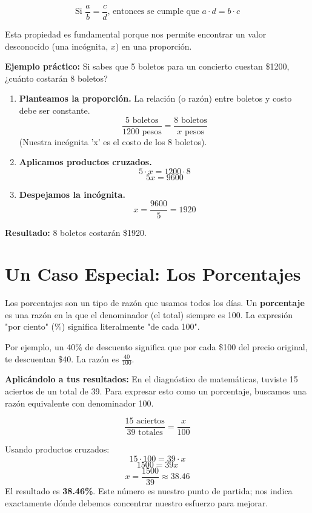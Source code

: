 \documentclass[12pt,a4paper]{article}
\begin{document}
$$ \text{Si } \frac{a}{b} = \frac{c}{d} \text{, entonces se cumple que } a \cdot d = b \cdot c $$

Esta propiedad es fundamental porque nos permite encontrar un valor desconocido (una inc\'{o}gnita, $x$) en una proporci\'{o}n.

\textbf{Ejemplo pr\'{a}ctico:} Si sabes que 5 boletos para un concierto cuestan \$1200, ¿cu\'{a}nto costar\'{a}n 8 boletos?

\begin{enumerate}
    \item \textbf{Planteamos la proporci\'{o}n.} La relaci\'{o}n (o raz\'{o}n) entre boletos y costo debe ser constante.
    $$ \frac{5 \text{ boletos}}{1200 \text{ pesos}} = \frac{8 \text{ boletos}}{x \text{ pesos}} $$
    (Nuestra inc\'{o}gnita 'x' es el costo de los 8 boletos).

    \item \textbf{Aplicamos productos cruzados.}
    $$ 5 \cdot x = 1200 \cdot 8 $$
    $$ 5x = 9600 $$

    \item \textbf{Despejamos la inc\'{o}gnita.}
    $$ x = \frac{9600}{5} = 1920 $$
\end{enumerate}
\textbf{Resultado:} 8 boletos costar\'{a}n \$1920.

\section{Un Caso Especial: Los Porcentajes}

Los porcentajes son un tipo de raz\'{o}n que usamos todos los d\'{i}as. Un \textbf{porcentaje} es una raz\'{o}n en la que el denominador (el total) siempre es 100. La expresi\'{o}n "por ciento" (\%) significa literalmente "de cada 100".

Por ejemplo, un 40\% de descuento significa que por cada \$100 del precio original, te descuentan \$40. La raz\'{o}n es $ \frac{40}{100} $.

\textbf{Aplic\'{a}ndolo a tus resultados:} En el diagn\'{o}stico de matem\'{a}ticas, tuviste 15 aciertos de un total de 39. Para expresar esto como un porcentaje, buscamos una raz\'{o}n equivalente con denominador 100.

$$ \frac{15 \text{ aciertos}}{39 \text{ totales}} = \frac{x}{100} $$

Usando productos cruzados:
$$ 15 \cdot 100 = 39 \cdot x $$
$$ 1500 = 39x $$
$$ x = \frac{1500}{39} \approx 38.46 $$
El resultado es \textbf{38.46\%}. Este n\'{u}mero es nuestro punto de partida; nos indica exactamente d\'{o}nde debemos concentrar nuestro esfuerzo para mejorar.
\end{document}
